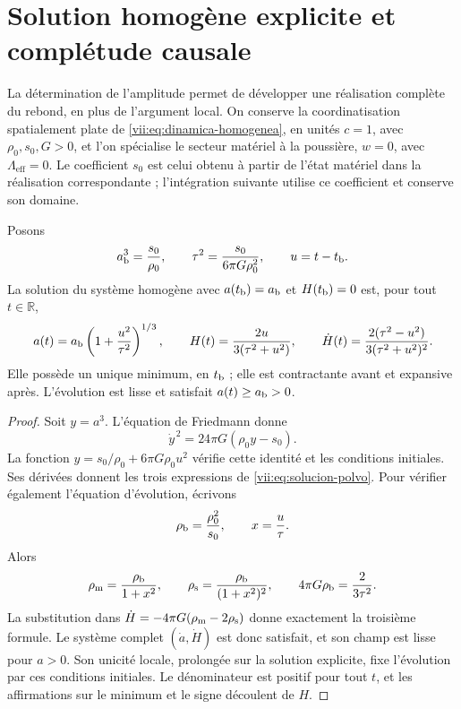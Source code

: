 \section{Solution homogène explicite et complétude causale}
\label{vii:sec:solucion-homogenea}
La détermination de l'amplitude permet de développer une réalisation complète du rebond, en plus de l'argument local. On conserve la coordinatisation spatialement plate de \eqref{vii:eq:dinamica-homogenea}, en unités \(c=1\), avec \(\rho_0,s_0,G>0\), et l'on spécialise le secteur matériel à la poussière, \(w=0\), avec \(\Lambda_{\mathrm{eff}}=0\). Le coefficient \(s_0\) est celui obtenu à partir de l'état matériel dans la réalisation correspondante ; l'intégration suivante utilise ce coefficient et conserve son domaine.

\begin{theorem}
\label{vii:thm:rebote-polvo}
Posons
\[
 a_{\rm b}^3=\frac{s_0}{\rho_0},\qquad
 \tau^2=\frac{s_0}{6\pi G\rho_0^2},\qquad u=t-t_{\rm b}.
\]
La solution du système homogène avec
\(a(t_{\rm b})=a_{\rm b}\) et \(H(t_{\rm b})=0\) est, pour tout
\(t\in\mathbb R\),
\begin{equation}
 a(t)=a_{\rm b}\left(1+\frac{u^2}{\tau^2}\right)^{1/3},
 \qquad H(t)=\frac{2u}{3(\tau^2+u^2)},\qquad
 \dot H(t)=\frac{2(\tau^2-u^2)}{3(\tau^2+u^2)^2}.
 \label{vii:eq:solucion-polvo}
\end{equation}
Elle possède un unique minimum, en \(t_{\rm b}\) ; elle est contractante avant et expansive après. L'évolution est lisse et satisfait \(a(t)\geq a_{\rm b}>0\).
\end{theorem}
\begin{proof}
Soit \(y=a^3\). L'équation de Friedmann donne
\[
 \dot y^{\,2}=24\pi G(\rho_0y-s_0).
\]
La fonction \(y=s_0/\rho_0+6\pi G\rho_0u^2\) vérifie cette
identité et les conditions initiales. Ses dérivées donnent les
trois expressions de \eqref{vii:eq:solucion-polvo}. Pour vérifier
également l'équation d'évolution, écrivons
\[
 \rho_{\rm b}=\frac{\rho_0^2}{s_0},\qquad
 x=\frac{u}{\tau}.
\]
Alors
\[
 \rho_{\rm m}=\frac{\rho_{\rm b}}{1+x^2},\qquad
 \rho_{\rm s}=\frac{\rho_{\rm b}}{(1+x^2)^2},\qquad
 4\pi G\rho_{\rm b}=\frac{2}{3\tau^2}.
\]
La substitution dans \(\dot H=-4\pi G(\rho_{\rm m}-2\rho_{\rm s})\) donne exactement la troisième formule. Le système complet \((\dot a,\dot H)\) est donc satisfait, et son champ est lisse pour \(a>0\). Son unicité locale, prolongée sur la solution explicite, fixe l'évolution par ces conditions initiales. Le dénominateur est positif pour tout \(t\), et les affirmations sur le minimum et le signe découlent de \(H\).
\end{proof}

